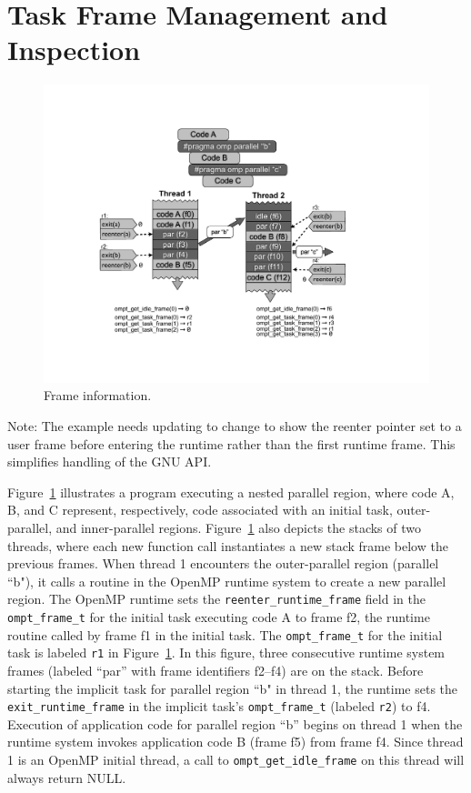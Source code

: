 \documentclass{article}
\begin{document}
\clearpage
\section{Task Frame Management and Inspection}
\label{app:frame}

   \begin{figure}[h]
    \centering
        \includegraphics[scale=0.55]{callstack-cropped.pdf}
    \caption{Frame information.}
    \label{fig:frame}
\end{figure}

\noindent
{\color{red} Note: The example needs updating to change to show the reenter pointer set to a user frame before entering the runtime rather than the first runtime frame. This simplifies handling of the GNU API.}

\sloppy
Figure~\ref{fig:frame} illustrates a program executing a nested parallel region, where code A, B, and C represent, respectively, code associated with an initial task, outer-parallel, and inner-parallel regions.  Figure~\ref{fig:frame}  also depicts the stacks of two threads, where each new function call instantiates a new stack frame below the previous frames. When thread 1 encounters the outer-parallel region (parallel ``b"), it calls a routine in the OpenMP runtime system to create a new parallel region. The OpenMP runtime sets the \verb|reenter_runtime_frame| field in the \verb|ompt_frame_t| for the initial task executing code A to  frame f2, the runtime routine called by frame f1 in the initial task. The  \verb|ompt_frame_t| for the initial task is labeled  \verb|r1| in Figure~\ref{fig:frame}. In this figure, three consecutive runtime system frames (labeled ``par'' with frame identifiers f2--f4) are on the stack. 
Before starting the implicit task for parallel region ``b" in thread 1, the runtime sets the \verb|exit_runtime_frame| in the implicit task's \verb|ompt_frame_t|  (labeled \verb|r2|) to f4. Execution of application code for parallel region ``b''  begins on thread 1  when the runtime system invokes application code B (frame f5) from frame f4. Since thread 1 is an OpenMP initial thread, a call to  \verb|ompt_get_idle_frame|  on this thread will always return NULL.
\end{document}
